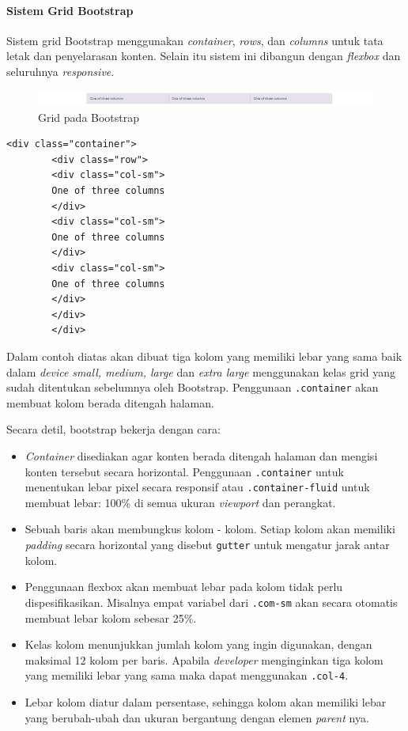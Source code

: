 \documentclass[a4paper,twoside]{article}
\begin{document}
\begin{enumerate}
		\paragraph{Sistem Grid Bootstrap} \par
		Sistem grid Bootstrap menggunakan \textit{container}, \textit{rows}, dan \textit{columns} untuk tata letak dan penyelarasan konten. Selain itu sistem ini dibangun dengan \textit{flexbox} dan seluruhnya \textit{responsive}. \cite{bootstrap:19}
		\begin{figure} [H]
			\centering  
			\includegraphics[scale=0.7]{gridbasic_bootstrap.png}  
			\caption{Grid pada Bootstrap} 
		\end{figure}
		
		\begin{lstlisting}[frame=single] 
		<div class="container">
		<div class="row">
		<div class="col-sm">
		One of three columns
		</div>
		<div class="col-sm">
		One of three columns
		</div>
		<div class="col-sm">
		One of three columns
		</div>
		</div>
		</div>
		\end{lstlisting}
		Dalam contoh diatas akan dibuat tiga kolom yang memiliki lebar yang sama baik dalam \textit{device} \textit{small, medium, large} dan \textit{extra large} menggunakan kelas grid yang sudah ditentukan sebelumnya oleh Bootstrap. Penggunaan \verb|.container| akan membuat kolom berada ditengah halaman.
		
		Secara detil, bootstrap bekerja dengan cara:
		\begin{itemize}
			\item \textit{Container} disediakan agar konten berada ditengah halaman dan mengisi konten tersebut secara horizontal. Penggunaan \verb|.container| untuk menentukan lebar pixel secara responsif atau \verb|.container-fluid| untuk membuat lebar: 100\%  di semua ukuran \textit{viewport} dan perangkat.
			\item Sebuah baris akan membungkus kolom - kolom. Setiap kolom akan memiliki \textit{padding} secara horizontal yang disebut \verb|gutter| untuk mengatur jarak antar kolom.
			\item Penggunaan flexbox akan membuat lebar pada kolom tidak perlu dispesifikasikan. Misalnya empat variabel dari \verb|.com-sm| akan secara otomatis membuat lebar kolom sebesar 25\%.
			\item Kelas kolom menunjukkan jumlah kolom yang ingin digunakan, dengan maksimal 12 kolom per baris. Apabila \textit{developer} menginginkan tiga kolom yang memiliki lebar yang sama maka dapat menggunakan \texttt{.col-4}.
			\item Lebar kolom diatur dalam persentase, sehingga kolom akan memiliki lebar yang berubah-ubah dan ukuran bergantung dengan elemen \textit{parent} nya.
		\end{itemize}

\end{enumerate}
\end{document}
